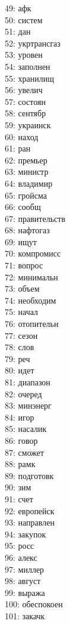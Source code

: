 \documentclass[14pt]{matmex-diploma-custom}
\begin{document}
\begin{appendices}
\begin{multicols}{4}
49: афк\\
50: систем\\
51: дан\\
52: укртрансгаз\\
53: уровен\\
54: заполнен\\
55: хранилищ\\
56: увелич\\
57: состоян\\
58: сентябр\\
59: украинск\\
60: наход\\
61: ран\\
62: премьер\\
63: министр\\
64: владимир\\
65: гройсма\\
66: сообщ\\
67: правительств\\
68: нафтогаз\\
69: ищут\\
70: компромисс\\
71: вопрос\\
72: минимальн\\
73: объем\\
74: необходим\\
75: начал\\
76: отопительн\\
77: сезон\\
78: слов\\
79: реч\\
80: идет\\
81: диапазон\\
82: очеред\\
83: минэнерг\\
84: игор\\
85: насалик\\
86: говор\\
87: сможет\\
88: рамк\\
89: подготовк\\
90: зим\\
91: счет\\
92: европейск\\
93: направлен\\
94: закупок\\
95: росс\\
96: алекс\\
97: миллер\\
98: август\\
99: выража\\
100: обеспокоен\\
101: закачк
\end{multicols}


\end{appendices}
\end{document}
